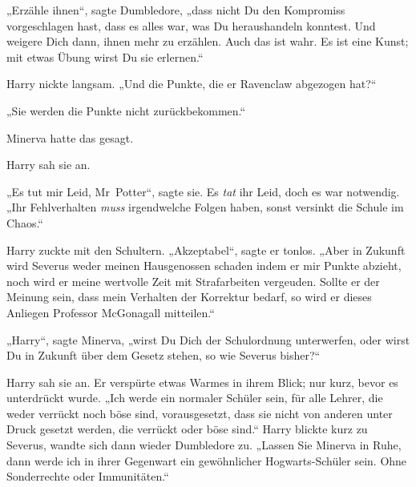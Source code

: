 „Erzähle ihnen“, sagte Dumbledore, „dass nicht Du den Kompromiss vorgeschlagen hast, dass es alles war, was Du heraushandeln konntest. Und weigere Dich dann, ihnen mehr zu erzählen. Auch das ist wahr. Es ist eine Kunst; mit etwas Übung wirst Du sie erlernen.“ 

Harry nickte langsam. „Und die Punkte, die er Ravenclaw abgezogen hat?“ 

„Sie werden die Punkte nicht zurückbekommen.“ 

Minerva hatte das gesagt. 

Harry sah sie an. 

„Es tut mir Leid, Mr~Potter“, sagte sie. Es \emph{tat} ihr Leid, doch es war notwendig. „Ihr Fehlverhalten \emph{muss} irgendwelche Folgen haben, sonst versinkt die Schule im Chaos.“ 

Harry zuckte mit den Schultern. „Akzeptabel“, sagte er tonlos. „Aber in Zukunft wird Severus weder meinen Hausgenossen schaden indem er mir Punkte abzieht, noch wird er meine wertvolle Zeit mit Strafarbeiten vergeuden. Sollte er der Meinung sein, dass mein Verhalten der Korrektur bedarf, so wird er dieses Anliegen Professor McGonagall mitteilen.“ 

„Harry“, sagte Minerva, „wirst Du Dich der Schulordnung unterwerfen, oder wirst Du in Zukunft über dem Gesetz stehen, so wie Severus bisher?“ 

Harry sah sie an. Er verspürte etwas Warmes in ihrem Blick; nur kurz, bevor es unterdrückt wurde. „Ich werde ein normaler Schüler sein, für alle Lehrer, die weder verrückt noch böse sind, vorausgesetzt, dass sie nicht von anderen unter Druck gesetzt werden, die verrückt oder böse sind.“ Harry blickte kurz zu Severus, wandte sich dann wieder Dumbledore zu. „Lassen Sie Minerva in Ruhe, dann werde ich in ihrer Gegenwart ein gewöhnlicher Hogwarts-Schüler sein. Ohne Sonderrechte oder Immunitäten.“ 

